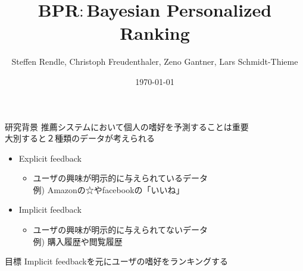 \documentclass[aspectratio=43, dvipdfmx, 11pt]{beamer} %
\title[BPR]{BPR$\colon$Bayesian Personalized Ranking}
\subtitle{}
\author[山田倫太郎]{Steffen Rendle, Christoph Freudenthaler, Zeno Gantner, Lars Schmidt-Thieme}
\institute[竹内・烏山研究室]{Presenter: 山田倫太郎}
\date{\today}
\begin{document}
\maketitle

\begin{frame}{研究背景}
    推薦システムにおいて個人の嗜好を予測することは重要\\
    \vspace{6mm}
    大別すると２種類のデータが考えられる
    \begin{itemize}
        \item Explicit feedback
            \begin{itemize}
                \item ユーザの興味が明示的に与えられているデータ\\
                \quad 例) Amazonの☆やfacebookの「いいね」
            \end{itemize}
        \item \alert{Implicit feedback}
            \begin{itemize}
                \item ユーザの興味が明示的に与えられてないデータ\\
                \quad 例) 購入履歴や閲覧履歴
            \end{itemize}
    \end{itemize}
        \begin{block}{目標}
        Implicit feedbackを元にユーザの嗜好をランキングする
        \end{block}{}
\end{frame}
\end{document}
